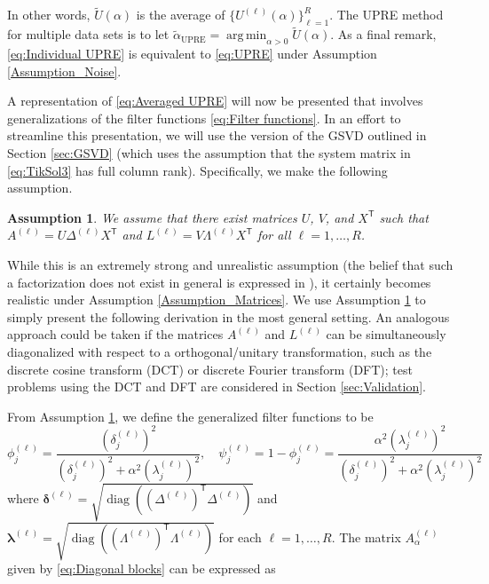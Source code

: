 \documentclass[12pt]{article}
\newcommand{\trans}[1]{{#1}^\mathsf{T}}	%
\DeclareMathOperator{\diag}{diag}	%
\newcommand{\regparam}{\alpha}
\DeclareMathOperator*{\argmin}{arg\,min}
\newcommand{\filt}{\phi}
\newcommand{\mfilt}{\psi}
\newcommand{\A}{A_{\regparam}}	%
\newcommand{\U}{U}	%
\newtheorem{assumption}{Assumption}
\begin{document}
\noindent In other words, $\widetilde{\U}(\regparam)$ is the average of $\{\U^{(\ell)}(\regparam)\}_{\ell=1}^R$. The UPRE method for multiple data sets is to let $\widetilde{\regparam}_{\textrm{UPRE}} = \argmin_{\regparam > 0} \widetilde{\U}(\regparam)$. As a final remark, \eqref{eq:Individual UPRE} is equivalent to \eqref{eq:UPRE} under Assumption \ref{Assumption_Noise}. \par
A representation of \eqref{eq:Averaged UPRE} will now be presented that involves generalizations of the filter functions \eqref{eq:Filter functions}. In an effort to streamline this presentation, we will use the version of the GSVD outlined in Section \ref{sec:GSVD} (which uses the assumption that the system matrix in \eqref{eq:TikSol3} has full column rank). Specifically, we make the following assumption.
\begin{assumption}
\label{Assumption_Diagonalization}
We assume that there exist matrices $U$, $V$, and $\trans{X}$ such that $A^{(\ell)} = U{\Delta^{(\ell)}}\trans{X}$ and  $L^{(\ell)} = V{\Lambda^{(\ell)}}\trans{X}$ for all $\ell = 1,\ldots,R$. 
\end{assumption}
\noindent While this is an extremely strong and unrealistic assumption (the belief that such a factorization does not exist in general is expressed in \cite{Brezinski2003}), it certainly becomes realistic under Assumption \ref{Assumption_Matrices}. We use Assumption \ref{Assumption_Diagonalization} to simply present the following derivation in the most general setting. An analogous approach could be taken if the matrices $A^{(\ell)}$ and $L^{(\ell)}$ can be simultaneously diagonalized with respect to a orthogonal/unitary transformation, such as the discrete cosine transform (DCT) or discrete Fourier transform (DFT); test problems using the DCT and DFT are considered in Section \ref{sec:Validation}. \par
From Assumption \ref{Assumption_Diagonalization}, we define the generalized filter functions to be
\begin{equation}
\label{eq:Filter functions 2}
\filt^{(\ell)}_j = \frac{\left(\delta^{(\ell)}_j\right)^2}{\left(\delta^{(\ell)}_j\right)^2 + \regparam^2 \left(\lambda^{(\ell)}_j\right)^2}, \quad \mfilt^{(\ell)}_j = 1 - \filt^{(\ell)}_j = \frac{\regparam^2 \left(\lambda^{(\ell)}_j\right)^2}{\left(\delta^{(\ell)}_j\right)^2 + \regparam^2 \left(\lambda^{(\ell)}_j\right)^2}
\end{equation}
where $\bm{\delta}^{(\ell)} = \sqrt{\diag(\trans{(\Delta^{(\ell)})}\Delta^{(\ell)})}$ and $\bm{\lambda}^{(\ell)} = \sqrt{\diag(\trans{(\Lambda^{(\ell)})}\Lambda^{(\ell)})}$ for each $\ell = 1,\ldots,R$. The matrix $\A^{(\ell)}$ given by \eqref{eq:Diagonal blocks} can be expressed as
\end{document}
